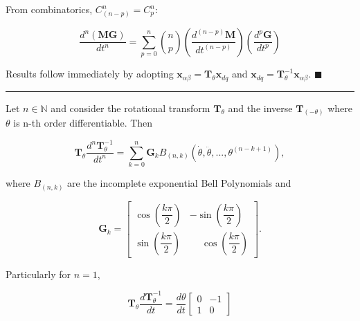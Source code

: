 	From combinatorics, $C^n_{\left(n-p\right)} = C^n_p$:

\begin{equation} \dfrac{d^n\left(\mathbf{MG}\right)}{dt^n} = \sum\limits_{p=0}^{n} {n\choose p} \left(\dfrac{d^{\left(n-p\right)} \mathbf{M}}{dt^{\left(n-p\right)}}\right) \left(\dfrac{d^p \mathbf{G}}{dt^p}\right)  \end{equation}

	Results follow immediately by adopting $\mathbf{x}_{\alpha\beta} = \mathbf{T}_\theta \mathbf{x}_{dq}$ and $\mathbf{x}_{dq} = \mathbf{T}^{-1}_\theta \mathbf{x}_{\alpha\beta}$. \hfill$\blacksquare$

\vspace{5mm}
\hrule
\vspace{5mm}

\begin{lemma} \label{lemma:1p_t_ndifftminus_product}%

	Let $n\in\mathbb{N}$ and consider the rotational transform $\mathbf{T}_\theta$ and the inverse $\mathbf{T}_{\left(-\theta\right)}$ where $\theta$ is n-th order differentiable. Then

\begin{equation} \mathbf{T}_\theta \dfrac{d^n\mathbf{T}^{-1}_\theta}{dt^n} = \sum\limits_{k=0}^n \mathbf{G}_k B_{\left(n,k\right)}\left(\dot{\theta},\ddot{\theta},...,\theta^{(n-k+1)}\right), \end{equation}

	\noindent where $B_{\left(n,k\right)}$ are the incomplete exponential Bell Polynomials and

\begin{equation}
\mathbf{G}_k = 
\left[\begin{array}{ccc}
 \cos\left( \dfrac{k\pi}{2}\right) &  -\sin\left(\dfrac{k\pi}{2}\right) \\[5mm]
 \sin\left( \dfrac{k\pi}{2}\right) & \phantom{-} \cos\left(\dfrac{k\pi}{2}\right)
\end{array}\right].
\end{equation}

	Particularly for $n=1$,

\begin{equation} \mathbf{T}_\theta\dfrac{d\mathbf{T}_\theta^{-1}}{dt} = \dfrac{d\theta}{dt} \left[\begin{array}{ccc}    0 & -1 \\[5mm] 1 & 0 \end{array}\right] \end{equation}

%

\end{lemma} 

